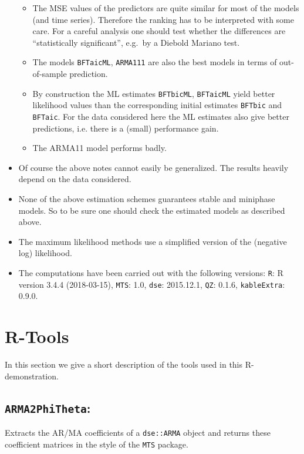 \documentclass[]{article}
\providecommand{\tightlist}{%
  \setlength{\itemsep}{0pt}\setlength{\parskip}{0pt}}
\begin{document}
\begin{itemize}
  \begin{itemize}
  \tightlist
  \item
    The MSE values of the predictors are quite similar for most of the
    models (and time series). Therefore the ranking has to be
    interpreted with some care. For a careful analysis one should test
    whether the differences are ``statistically significant'', e.g.~by a
    Diebold Mariano test.
  \item
    The models \texttt{BFTaicML}, \texttt{ARMA111} are also the best
    models in terms of out-of-sample prediction.
  \item
    By construction the ML estimates \texttt{BFTbicML},
    \texttt{BFTaicML} yield better likelihood values than the
    corresponding initial estimates \texttt{BFTbic} and \texttt{BFTaic}.
    For the data considered here the ML estimates also give better
    predictions, i.e. there is a (small) performance gain.
  \item
    The ARMA11 model performs badly.
  \end{itemize}
\item
  Of course the above notes cannot easily be generalized. The results
  heavily depend on the data considered.
\item
  None of the above estimation schemes guarantees stable and miniphase
  models. So to be sure one should check the estimated models as
  described above.
\item
  The maximum likelihood methods use a simplified version of the
  (negative log) likelihood.
\item
  The computations have been carried out with the following versions:
  \texttt{R}: R version 3.4.4 (2018-03-15), \texttt{MTS}: 1.0,
  \texttt{dse}: 2015.12.1, \texttt{QZ}: 0.1.6, \texttt{kableExtra}:
  0.9.0.
\end{itemize}

\section{R-Tools}\label{r-tools}

In this section we give a short description of the tools used in this
R-demonstration.

\subsection{\texorpdfstring{\texttt{ARMA2PhiTheta}:}{ARMA2PhiTheta:}}\label{arma2phitheta}

Extracts the AR/MA coefficients of a \texttt{dse::ARMA} object and
returns these coefficient matrices in the style of the \texttt{MTS}
package.
\end{document}
